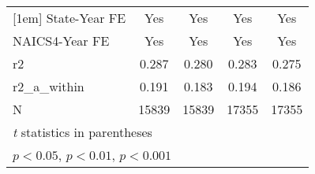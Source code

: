 {\begin{tabular}{l*{4}{c}}
[1em]
State-Year FE&         Yes         &         Yes         &         Yes         &         Yes         \\
[1em]
NAICS4-Year FE&         Yes         &         Yes         &         Yes         &         Yes         \\
\hline
r2          &       0.287         &       0.280         &       0.283         &       0.275         \\
r2\_a\_within &       0.191         &       0.183         &       0.194         &       0.186         \\
N           &       15839         &       15839         &       17355         &       17355         \\
\hline\hline
\multicolumn{5}{l}{\footnotesize \textit{t} statistics in parentheses}\\
\multicolumn{5}{l}{\footnotesize \sym{*} \(p<0.05\), \sym{**} \(p<0.01\), \sym{***} \(p<0.001\)}\\
\end{tabular}
}
